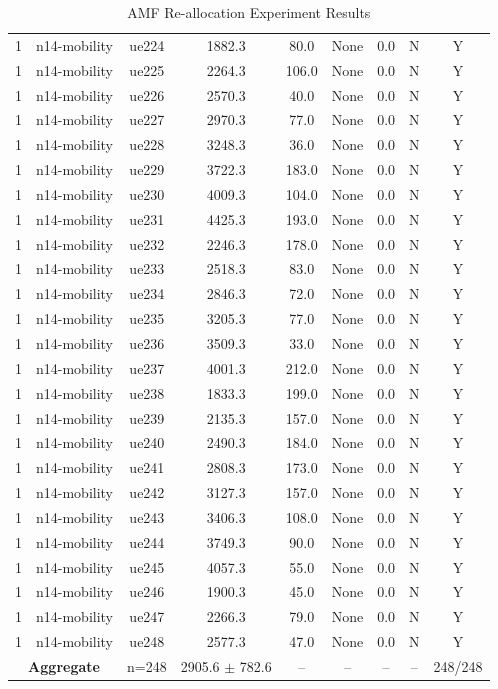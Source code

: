 \begin{table}[ht]
\begin{tabular}{|c|c|c|c|c|c|c|c|c|}
1 & n14-mobility & ue224 & 1882.3 & 80.0 & None & 0.0 & N & Y \\
1 & n14-mobility & ue225 & 2264.3 & 106.0 & None & 0.0 & N & Y \\
1 & n14-mobility & ue226 & 2570.3 & 40.0 & None & 0.0 & N & Y \\
1 & n14-mobility & ue227 & 2970.3 & 77.0 & None & 0.0 & N & Y \\
1 & n14-mobility & ue228 & 3248.3 & 36.0 & None & 0.0 & N & Y \\
1 & n14-mobility & ue229 & 3722.3 & 183.0 & None & 0.0 & N & Y \\
1 & n14-mobility & ue230 & 4009.3 & 104.0 & None & 0.0 & N & Y \\
1 & n14-mobility & ue231 & 4425.3 & 193.0 & None & 0.0 & N & Y \\
1 & n14-mobility & ue232 & 2246.3 & 178.0 & None & 0.0 & N & Y \\
1 & n14-mobility & ue233 & 2518.3 & 83.0 & None & 0.0 & N & Y \\
1 & n14-mobility & ue234 & 2846.3 & 72.0 & None & 0.0 & N & Y \\
1 & n14-mobility & ue235 & 3205.3 & 77.0 & None & 0.0 & N & Y \\
1 & n14-mobility & ue236 & 3509.3 & 33.0 & None & 0.0 & N & Y \\
1 & n14-mobility & ue237 & 4001.3 & 212.0 & None & 0.0 & N & Y \\
1 & n14-mobility & ue238 & 1833.3 & 199.0 & None & 0.0 & N & Y \\
1 & n14-mobility & ue239 & 2135.3 & 157.0 & None & 0.0 & N & Y \\
1 & n14-mobility & ue240 & 2490.3 & 184.0 & None & 0.0 & N & Y \\
1 & n14-mobility & ue241 & 2808.3 & 173.0 & None & 0.0 & N & Y \\
1 & n14-mobility & ue242 & 3127.3 & 157.0 & None & 0.0 & N & Y \\
1 & n14-mobility & ue243 & 3406.3 & 108.0 & None & 0.0 & N & Y \\
1 & n14-mobility & ue244 & 3749.3 & 90.0 & None & 0.0 & N & Y \\
1 & n14-mobility & ue245 & 4057.3 & 55.0 & None & 0.0 & N & Y \\
1 & n14-mobility & ue246 & 1900.3 & 45.0 & None & 0.0 & N & Y \\
1 & n14-mobility & ue247 & 2266.3 & 79.0 & None & 0.0 & N & Y \\
1 & n14-mobility & ue248 & 2577.3 & 47.0 & None & 0.0 & N & Y \\
\multicolumn{2}{|c|}{\textbf{Aggregate}} & n=248 & 2905.6 $\pm$ 782.6 & -- & -- & -- & -- & 248/248 \\
\hline
\end{tabular}
\caption{AMF Re-allocation Experiment Results}
\label{tab:amf_realloc}
\end{table}
